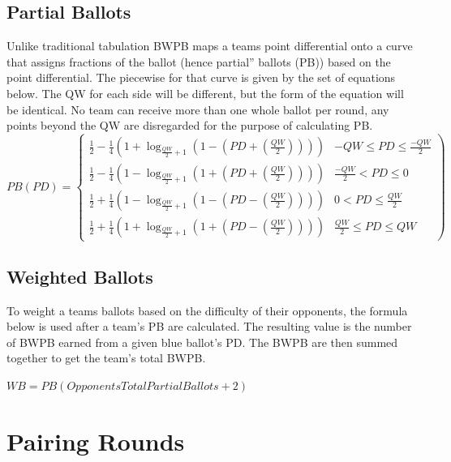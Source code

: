\documentclass{article}
\begin{document}
\subsection{Partial Ballots}
Unlike traditional tabulation BWPB maps a teams point differential onto a curve that assigns fractions of the ballot (hence partial'' ballots (PB)) based on the point differential. The piecewise for that curve is given by the set of equations below. The QW for each side will be different, but the form of the equation will be identical. No team can receive more than one whole ballot per round, any points beyond the QW are disregarded for the purpose of calculating PB.\\
\begin{displaymath}
   PB(PD) = \left\{
     \begin{array}{lr}
       \frac{1}{2}-\frac{1}{4}\left(1+\log_{\frac{QW}{2}+1}\left(1-\left(PD+\left(\frac{QW}{2}\right)\right)\right)\right) &  -QW\le PD\le \frac{-QW}{2}\\
       \frac{1}{2}-\frac{1}{4}\left(1-\log_{\frac{QW}{2}+1}\left(1+\left(PD+\left(\frac{QW}{2}\right)\right)\right)\right) &  \frac{-QW}{2}<PD\le 0\\
       \frac{1}{2}+\frac{1}{4}\left(1-\log_{\frac{QW}{2}+1}\left(1-\left(PD-\left(\frac{QW}{2}\right)\right)\right)\right) &  0<PD\le\frac{QW}{2}\\
       \frac{1}{2}+\frac{1}{4}\left(1+\log_{\frac{QW}{2}+1}\left(1+\left(PD-\left(\frac{QW}{2}\right)\right)\right)\right) & \frac{QW}{2}\le PD \le QW
     \end{array}
  \right)
\end{displaymath}
\subsection{Weighted Ballots}
To weight a teams ballots based on the difficulty of their opponents, the formula below is used after a team's PB are calculated. The resulting value is the number of BWPB earned from a given blue ballot's PD. The BWPB are then summed together to get the team's total BWPB.

\begin{center}
$WB=PB\left(OpponentsTotalPartialBallots+2\right)$
\end{center}

\section{Pairing Rounds}
\label{roundPairing}
\end{document}
